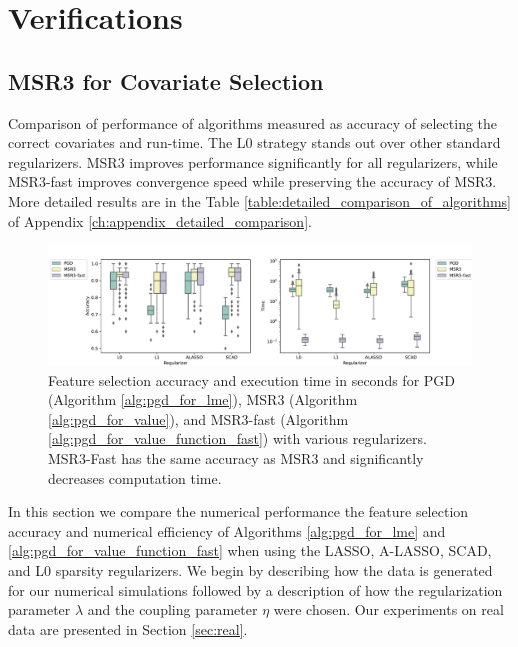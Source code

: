 \section{Verifications}
\label{sec:applications}

\subsection{MSR3 for Covariate Selection}
\label{ch:sr3_l1}

\begin{table}
\centering

\caption{\label{table:comparison_of_algorithms} Comparison of performance of algorithms measured as accuracy of selecting the correct covariates and run-time. The L0 strategy stands out 
over other standard regularizers. MSR3 improves performance significantly for all regularizers, while MSR3-fast improves convergence speed while preserving the 
accuracy of MSR3.  
More detailed results are in the Table \ref{table:detailed_comparison_of_algorithms} of Appendix \ref{ch:appendix_detailed_comparison}.}
\end{table}

\begin{figure}
    \centering
	\includegraphics[width=1.0\textwidth]{figures/performance_picture_current}
	\caption{\label{fig:box_with_whiskers_for_synthetic_data}	Feature selection accuracy and execution time in seconds for PGD 
	(Algorithm \ref{alg:pgd_for_lme}), 
	MSR3 (Algorithm \ref{alg:pgd_for_value}), and MSR3-fast
	(Algorithm \ref{alg:pgd_for_value_function_fast}) with various regularizers. 
	MSR3-Fast has the same accuracy as 
	MSR3 and significantly decreases computation time.}
\end{figure}

In this section we 
{compare the numerical performance 
the feature selection accuracy and numerical efficiency of Algorithms 
\ref{alg:pgd_for_lme} and 
\ref{alg:pgd_for_value_function_fast} when using the 
LASSO, A-LASSO, SCAD, and L0 sparsity regularizers.
We begin by describing how the data is generated for our numerical simulations 
followed by a description of how the  
regularization parameter $\lambda$ and the coupling parameter $\eta$  were chosen.
Our experiments on real data are presented in Section \ref{sec:real}.}

